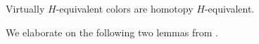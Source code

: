 \documentclass[a4paper,10pt
,draft
]{article}%
\newcommand{\J}{\mathbb J}
\renewcommand{\1}{\ensuremath{\mathbb{id}}}
\begin{document}


\begin{lemma}
      Virtually $H$-equivalent colors are homotopy $H$-equivalent. 
\end{lemma}

We elaborate on the following two lemmas from \cite{BM13}.
\end{document}
